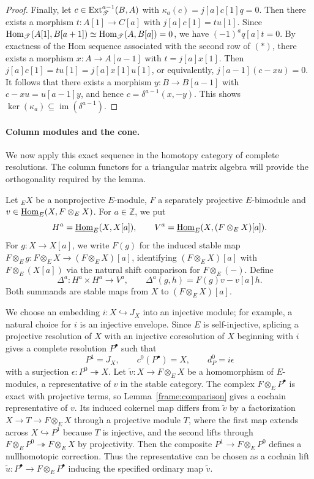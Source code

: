 \documentclass[11pt]{article}
\begin{document}
\begin{proof}
Finally, let $c\in{\rm Ext}_{\mathscr T}^{a-1}(B,A)$ with $\kappa_a(c)=j[a]c[1]q=0$. Then there exists a morphism
$t: A[1]\to C[a]$ with $j[a]c[1]=tu[1]$. Since ${\rm Hom}_\mathscr{T}(A[1], B[a+1])\simeq {\rm Hom}_\mathscr{T}(A, B[a])=0$, we have $(-1)^aq[a]t=0$.
By exactness of the Hom sequence associated with the second row of $(\ast)$, there exists a morphism $x:A\to A[a-1]$  with $t=j[a]x[1]$.
Then $j[a]c[1]=tu[1]=j[a]x[1]u[1]$, or equivalently, $j[a-1](c-xu)=0$.
It follows that there exists a morphism $y:B\to B[a-1]$ with $c-xu=u[a-1]y$, and hence $c=\delta^{a-1}(x,-y)$. This shows $\ker(\kappa_a)\subseteq \operatorname{im}(\delta^{a-1})$.
\end{proof}

\paragraph{Column modules and the cone.}

We now apply this exact sequence in the homotopy category of complete resolutions. The column functors for a triangular matrix algebra will provide the orthogonality required by the lemma.

Let ${_E}X$ be a nonprojective $E$-module, $F$ a separately projective $E$-bimodule and
$v\in\underline{{\rm Hom}}_E(X,F\otimes_E X)$. For $a\in\mathbb Z$, we put
$$ H^a=\underline{{\rm Hom}}_E(X,X[a]),\qquad V^a=\underline{{\rm Hom}}_E(X,(F\otimes_E X)[a]).$$
For $g:X\to X[a]$, we write $F(g)$ for the induced stable map $F\otimes_Eg: F\otimes_E X \to (F\otimes_E X)[a]$, identifying $(F\otimes_E X)[a]$ with $F\otimes_E (X[a])$ via the natural shift comparison for $F\otimes_E(-)$. Define
\begin{equation*}
\Delta^a: H^a\times H^a\longrightarrow V^a,
\qquad\Delta^a(g,h)=F(g)v-v[a]h.
\end{equation*}
Both summands are stable maps from $X$ to $(F\otimes_E X)[a]$.

We choose an embedding $i:X\hookrightarrow J_X$ into an injective module; for example, a natural choice for $i$ is an injective envelope. Since $E$ is self-injective, splicing a projective resolution of $X$ with an injective coresolution of $X$ beginning with $i$ gives a complete resolution $P^\bullet$ such that $$P^1=J_X,\qquad c^0(P^\bullet)=X,\qquad d_P^0=i\epsilon$$
with a surjection $\epsilon:P^0\twoheadrightarrow X$. Let $\widetilde v:X\to F\otimes_E X$ be a homomorphism of $E$-modules, a representative of $v$ in the stable category. The complex $F\otimes_E P^\bullet$ is exact with projective terms, so Lemma~\ref{frame:comparison} gives a cochain representative of
$v$. Its induced cokernel map differs from $\widetilde v$ by a
factorization $X\to T\to F\otimes_E X$ through a projective
module $T$, where the first map extends across $X\hookrightarrow P^1$
because $T$ is injective, and the second lifts through
$F\otimes_E P^0\twoheadrightarrow F\otimes_E X$ by projectivity.
Then the composite $P^1\to F\otimes_E P^0$ defines a nullhomotopic
correction. Thus the representative can be chosen as a cochain lift
$\widetilde u\colon P^\bullet\to F\otimes_E P^\bullet$ inducing the specified ordinary map $\widetilde v$.
\end{document}
